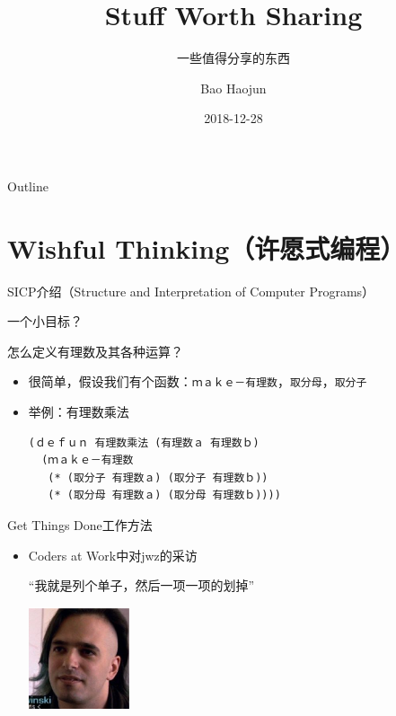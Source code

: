 \documentclass[presentation,dvipdfmx,CJKbookmarks]{beamer}
\author{Bao Haojun}
\date{2018-12-28}
\title{Stuff Worth Sharing}
\subtitle{一些值得分享的东西}
\begin{document}
\begin{CJK*}{UTF8}{simsun}

\maketitle
\begin{frame}{Outline}
\tableofcontents
\end{frame}

\CJKtilde

\section{Wishful Thinking（许愿式编程）}
\label{sec:orgde85b96}

\begin{frame}[fragile,label={sec:orgfb97c0a}]{SICP\thinspace 介绍（Structure and Interpretation of Computer Programs）}
 \begin{block}{一个小目标？}
\pause
\end{block}
\begin{block}{怎么定义有理数及其各种运算？}
\pause
\begin{itemize}[<+->]
\item 很简单，假设我们有\thinspace 个函数：\texttt{ｍａｋｅ－有理数}，\texttt{取分母}，\texttt{取分子}
\item 举例：有理数乘法

\begin{verbatim}
(ｄｅｆｕｎ 有理数乘法 (有理数ａ 有理数ｂ)
  (ｍａｋｅ－有理数
   (* (取分子 有理数ａ) (取分子 有理数ｂ))
   (* (取分母 有理数ａ) (取分母 有理数ｂ))))
\end{verbatim}
\end{itemize}
\end{block}
\end{frame}

\begin{frame}[label={sec:org8fbf8ad}]{Get Things Done\thinspace 工作方法}
\pause
\begin{itemize}[<+->]
\item Coders at Work\thinspace 中对\thinspace jwz\thinspace 的采访

“我就是列个单子，然后一项一项的划掉”

\begin{center}
\includegraphics[width=3cm]{./jwz.ps}
\end{center}


\end{itemize}
\end{frame}
\end{CJK*}
\end{document}
